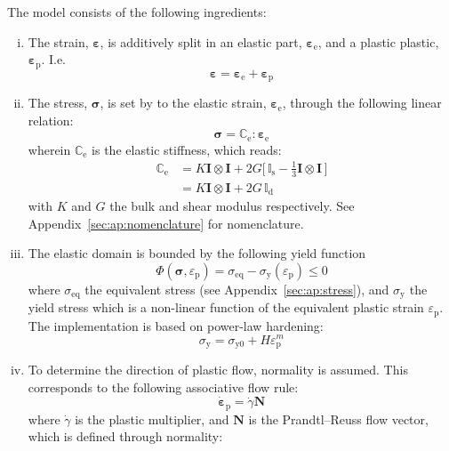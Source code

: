 \documentclass[times,namecite]{goose-article}
\begin{document}
The model consists of the following ingredients:
%
\begin{enumerate}[(i)]
%
\item The strain, $\bm{\varepsilon}$, is additively split in an elastic part, $\bm{\varepsilon}_\mathrm{e}$, and a plastic plastic, $\bm{\varepsilon}_\mathrm{p}$. I.e.
\begin{equation}
  \bm{\varepsilon}
  = \bm{\varepsilon}_\mathrm{e}
  + \bm{\varepsilon}_\mathrm{p}
\end{equation}
%
\item The stress, $\bm{\sigma}$, is set by to the elastic strain, $\bm{\varepsilon}_\mathrm{e}$, through the following linear relation:
\begin{equation}
  \bm{\sigma}
  = \mathbb{C}_\mathrm{e} : \bm{\varepsilon}_\mathrm{e}
\end{equation}
wherein $\mathbb{C}_\mathrm{e}$ is the elastic stiffness, which reads:
\begin{align}
  \mathbb{C}_\mathrm{e}
  &= K \bm{I} \otimes \bm{I}
   + 2 G \big[ \, \mathbb{I}_\mathrm{s} - \tfrac{1}{3} \bm{I} \otimes \bm{I} \, \big]
  \\
  &= K \bm{I} \otimes \bm{I}
  + 2 G \, \mathbb{I}_\mathrm{d}
\end{align}
with $K$ and $G$ the bulk and shear modulus respectively. See Appendix~\ref{sec:ap:nomenclature} for nomenclature.
%
\item The elastic domain is bounded by the following yield function
\begin{equation}
  \Phi( \bm{\sigma} , \varepsilon_\mathrm{p} )
  = \sigma_\mathrm{eq}
  - \sigma_\mathrm{y} (\varepsilon_\mathrm{p}) \leq 0
\end{equation}
where $\sigma_\mathrm{eq}$ the equivalent stress (see Appendix~\ref{sec:ap:stress}), and $\sigma_\mathrm{y}$ the yield stress which is a non-linear function of the equivalent plastic strain $\varepsilon_\mathrm{p}$. The implementation is based on power-law hardening:
\begin{equation}
  \sigma_\mathrm{y} = \sigma_\mathrm{y0} + H \varepsilon_\mathrm{p}^m
\end{equation}
%
\item To determine the direction of plastic flow, normality is assumed. This corresponds to the following associative flow rule:
\begin{equation}
  \dot{\bm{\varepsilon}}_\mathrm{p}
  = \dot{\gamma} \bm{N}
\end{equation}
where $\dot{\gamma}$ is the plastic multiplier, and $\bm{N}$ is the Prandtl--Reuss flow vector, which is defined through normality:

\end{enumerate}
\end{document}
